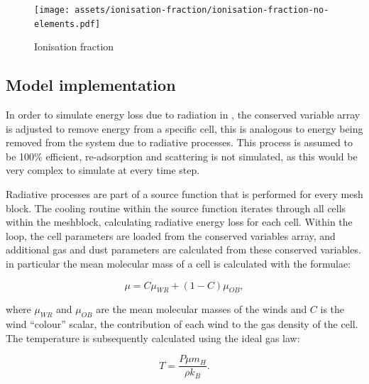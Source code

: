 \begin{figure}[h]
  \centering
  \texttt{[image: assets/ionisation-fraction/ionisation-fraction-no-elements.pdf]}
  \caption[Ionisation fraction for OB and WC stars]{Ionisation fraction}
  \label{fig:electron-curve-no-elements}
\end{figure}



\subsection{Model implementation}
\label{sec:cooling-implementation}

In order to simulate energy loss due to radiation in \athena{}, the conserved variable array is adjusted to remove energy from a specific cell, this is analogous to energy being removed from the system due to radiative processes.
This process is assumed to be 100\% efficient, re-adsorption and scattering is not simulated, as this would be very complex to simulate at every time step.


Radiative processes are part of a source function that is performed for every mesh block.
The cooling routine within the source function iterates through all cells within the meshblock, calculating radiative energy loss for each cell.
Within the loop, the cell parameters are loaded from the conserved variables array, and additional gas and dust parameters are calculated from these conserved variables.
in particular the mean molecular mass of a cell is calculated with the formulae:

\begin{equation}
  \mu = C\mu_{WR} + (1-C) \mu_{OB}, \label{eq:windaveraging}
\end{equation}

\noindent
where $\mu_{WR}$ and $\mu_{OB}$ are the mean molecular masses of the winds and $C$ is the wind ``colour'' scalar, the contribution of each wind to the gas density of the cell.
The temperature is subsequently calculated using the ideal gas law:

\begin{equation}
  T = \frac{P \mu m_H}{\rho k_B}.
\end{equation}

